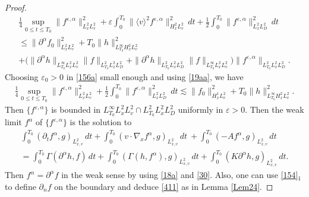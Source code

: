 \documentclass[reqno,a4paper]{amsart}
\numberwithin{equation}{section}
\newcommand{\1}{\mathbf{1}}
\newcommand{\ve}{\varepsilon}
\newcommand{\<}{\langle}
\renewcommand{\>}{\rangle}
\begin{document}
\begin{proof}
\begin{multline}\label{23}
	\frac{1}{4}\sup_{0\le t\le T_0}\| f^{\ve,\alpha}\|^2_{L^2_xL^2_v} + {\ve}\int^{T_0}_0\|\<v\>^{2} f^{\ve,\alpha}\|^2_{H^2_xL^2_v}\,dt + \frac{1}{2}\int^{T_0}_0\| f^{\ve,\alpha}\|_{L^2_xL^2_D}^2\,dt 
\\
	\le\|\partial^{\alpha} f_0\|^2_{L^2_xL^2_v} + T_0\|h\|^2_{L^\infty_{T_0}H^2_xL^2_v} \\+ \big(\|\partial^{\alpha} h\|_{L^\infty_{T_0}L^2_xL^2_v}\|f\|_{L^2_{T_0}L^2_xL^2_D}+\|\partial^{\alpha} h\|_{L^2_{T_0}L^2_xL^2_D}\|f\|_{L^\infty_{T_0}L^2_xL^2_v}\big)\|f^{\ve,\alpha}\|_{L^2_{T_0}L^2_xL^2_D}. 
\end{multline}
Choosing $\ve_0>0$ in \eqref{156a} small enough and using \eqref{19aa}, we have 
\begin{align}\label{23a}
\frac{1}{4}\sup_{0\le t\le T_0}\|f^{\ve,\alpha}\|^2_{L^2_xL^2_v} +  \frac{1}{2}\int^{T_0}_0\|f^{\ve,\alpha}\|_{L^2_xL^2_D}^2\,dt 
\lesssim \|f_0\|^2_{H^1_xL^2_v} + T_0\|h\|^2_{L^\infty_{T_0}H^2_xL^2_v}.
\end{align}
Then $\{f^{\ve,\alpha}\}$ is bounded in $L^\infty_{T_0}L^2_xL^2_v\cap L^2_{T_0}L^2_xL^2_D$ uniformly in $\ve>0$. 
Then the weak limit $f^{\alpha}$ of $\{f^{\ve,\alpha}\}$ is the solution to 
\begin{multline}\label{30}
	\int^{T_0}_0(\partial_tf^{\alpha},g)_{L^2_{x,v}}\,dt+\int^{T_0}_0(v\cdot \nabla_xf^{\alpha},g)_{L^2_{x,v}}\,dt\
	+\int^{T_0}_0(- A f^{\alpha},g)_{L^2_{x,v}}\,dt \\=\int^{T_0}_0\Gamma(\partial^{\alpha} h,f)\,dt+ \int^{T_0}_0(\Gamma(h,f^{\alpha}),g)_{L^2_{x,v}}\,dt+\int^{T_0}_0(K\partial^{\alpha} h,g)_{L^2_{x,v}}\,dt.
\end{multline}
 Then $f^{\alpha}=\partial^{\alpha} f$ in the weak sense by using \eqref{18a} and \eqref{30}. Also, one can use \eqref{154}$_1$ to define $\partial_nf$ on the boundary and deduce \eqref{411} as in Lemma \ref{Lem24}. 
 

\end{proof}
\end{document}
